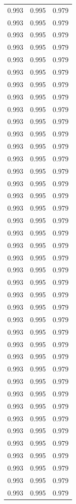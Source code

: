 \begin{tabular}{lrr}
0.993 & 0.995 & 0.979 \\
0.993 & 0.995 & 0.979 \\
0.993 & 0.995 & 0.979 \\
0.993 & 0.995 & 0.979 \\
0.993 & 0.995 & 0.979 \\
0.993 & 0.995 & 0.979 \\
0.993 & 0.995 & 0.979 \\
0.993 & 0.995 & 0.979 \\
0.993 & 0.995 & 0.979 \\
0.993 & 0.995 & 0.979 \\
0.993 & 0.995 & 0.979 \\
0.993 & 0.995 & 0.979 \\
0.993 & 0.995 & 0.979 \\
0.993 & 0.995 & 0.979 \\
0.993 & 0.995 & 0.979 \\
0.993 & 0.995 & 0.979 \\
0.993 & 0.995 & 0.979 \\
0.993 & 0.995 & 0.979 \\
0.993 & 0.995 & 0.979 \\
0.993 & 0.995 & 0.979 \\
0.993 & 0.995 & 0.979 \\
0.993 & 0.995 & 0.979 \\
0.993 & 0.995 & 0.979 \\
0.993 & 0.995 & 0.979 \\
0.993 & 0.995 & 0.979 \\
0.993 & 0.995 & 0.979 \\
0.993 & 0.995 & 0.979 \\
0.993 & 0.995 & 0.979 \\
0.993 & 0.995 & 0.979 \\
0.993 & 0.995 & 0.979 \\
0.993 & 0.995 & 0.979 \\
0.993 & 0.995 & 0.979 \\
0.993 & 0.995 & 0.979 \\
0.993 & 0.995 & 0.979 \\
0.993 & 0.995 & 0.979 \\
0.993 & 0.995 & 0.979 \\
0.993 & 0.995 & 0.979 \\
0.993 & 0.995 & 0.979 \\
0.993 & 0.995 & 0.979 \\
0.993 & 0.995 & 0.979 \\

\end{tabular}
